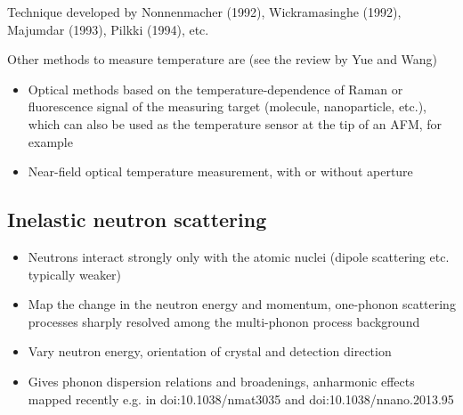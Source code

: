 Technique developed by Nonnenmacher (1992), Wickramasinghe (1992), Majumdar (1993), Pilkki (1994), etc.

Other methods to measure temperature are (see the review by Yue and Wang)
\begin{itemize}
 \item Optical methods based on the temperature-dependence of Raman or fluorescence signal of the measuring target (molecule, nanoparticle, etc.), which can also be used as the temperature sensor at the tip of an AFM, for example
 \item Near-field optical temperature measurement, with or without aperture
\end{itemize}

\subsection{Inelastic neutron scattering}
 \begin{itemize}
  \item Neutrons interact strongly only with the atomic nuclei (dipole scattering etc. typically weaker)
  \item Map the change in the neutron energy and momentum, one-phonon scattering processes sharply resolved among the multi-phonon process background
  \item Vary neutron energy, orientation of crystal and detection direction
  \item Gives phonon dispersion relations and broadenings, anharmonic effects mapped recently e.g. in doi:10.1038/nmat3035 and doi:10.1038/nnano.2013.95
 \end{itemize}
\fi
